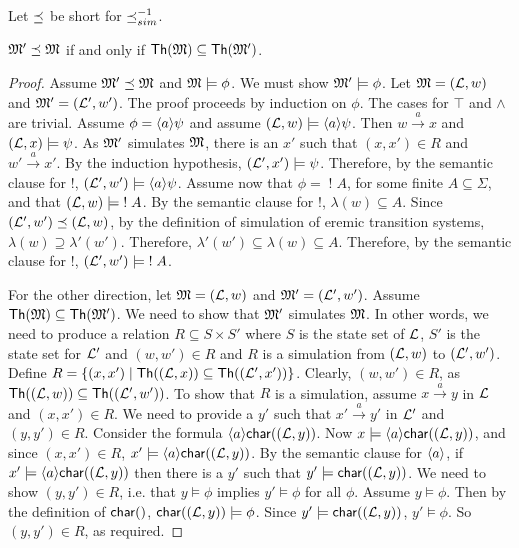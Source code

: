 \begin{definition}
Let $\preceq$  be short for $\preceq_{sim}^{-1}$.
\end{definition}




\begin{theorem}\label{theorem:completeLattice}
$\frak{M}' \preceq \frak{M}$ if and only if
$\mathsf{Th}(\frak{M}) \subseteq  \mathsf{Th}(\frak{M}')$.
\end{theorem}

\begin{proof}
Assume $\frak{M}' \preceq \frak{M}$ and $\frak{M} \models \phi$.  We must show
$\frak{M}' \models \phi$.  Let $\frak{M} = (\mathcal{L}, w)$ and $\frak{M}' = (\mathcal{L}',
w')$.  The proof proceeds by induction on $\phi$.  The cases for
$\top$ and $\land$ are trivial.  Assume $\phi = \langle a \rangle \psi$ and
assume $(\mathcal{L}, w) \models \langle a \rangle \psi$.  Then $w \xrightarrow{a} x$
and $(\mathcal{L}, x) \models \psi$.  As $\frak{M}'$ simulates $\frak{M}$, there is
an $x'$ such that $(x,x') \in R$ and $w' \xrightarrow{a} x'$.  By the
induction hypothesis, $(\mathcal{L}', x') \models \psi$.  Therefore, by the
semantic clause for $!$, $(\mathcal{L}', w') \models \langle a \rangle \psi$.  Assume
now that $\phi = \; ! \; A$, for some finite $A \subseteq \Sigma$, and
that $(\mathcal{L}, w) \models \; ! \; A$.  By the semantic clause for $!$,
$\lambda(w) \subseteq A$.  Since $(\mathcal{L}', w') \preceq (\mathcal{L}, w)$, by
the definition of simulation of eremic transition systems, $\lambda(w)
\supseteq \lambda'(w')$.  Therefore, $\lambda'(w') \subseteq
\lambda(w) \subseteq A$.  Therefore, by the semantic clause for $!$,
$(\mathcal{L}', w') \models \; ! \; A$.

For the other direction, let $\frak{M} = (\mathcal{L}, w)$ and $\frak{M}' = (\mathcal{L}',
w')$.  Assume $\mathsf{Th}(\frak{M}) \subseteq \mathsf{Th}(\frak{M}') $. We need to
show that $\frak{M}'$ simulates $\frak{M}$.  In other words, we need to
produce a relation $R \subseteq S \times S'$ where $S$ is the state
set of $\mathcal{L}$, $S'$ is the state set for $\mathcal{L}'$ and $(w,w') \in R$
and $R$ is a simulation from $(\mathcal{L}, w)$ to $ (\mathcal{L}', w')$.  Define $R
= \{(x,x') \; | \; \mathsf{Th}( (\mathcal{L}, x)) \subseteq \mathsf{Th}( (\mathcal{L}',
  x'))\}$.  Clearly, $(w,w') \in R$, as $\mathsf{Th}((\mathcal{L}, w)) \subseteq
\mathsf{Th}((\mathcal{L}', w')) $.  To show that $R$ is a simulation, assume $x
\xrightarrow{a} y$ in $\mathcal{L}$ and $(x,x') \in R$. 
We need to provide a
$y'$ such that $x' \xrightarrow{a} y'$ in $\mathcal{L}'$ and $(y,y') \in R$.  
Consider the formula $\langle a \rangle \mathsf{char}((\mathcal{L}, y))$. 
Now $x \models \langle a \rangle \mathsf{char}((\mathcal{L}, y))$, and since $(x,x') \in R$, $x' \models \langle a \rangle \mathsf{char}((\mathcal{L}, y))$.
By the semantic clause for $\MAY{a}$, if $x' \models \langle a \rangle \mathsf{char}((\mathcal{L}, y))$ then there is a $y'$ such that 
$y' \models \mathsf{char}((\mathcal{L}, y))$.
We need to show $(y,y') \in R$, i.e. that $y \models \phi$ implies $y' \models \phi$ for all $\phi$.
Assume $y \models \phi$. 
Then by the definition of $\CHAR$, $\mathsf{char}((\mathcal{L}, y)) \models \phi$.
Since $y' \models \mathsf{char}((\mathcal{L}, y))$, $y' \models \phi$. 
So $(y,y') \in R$, as required.


\end{proof}
